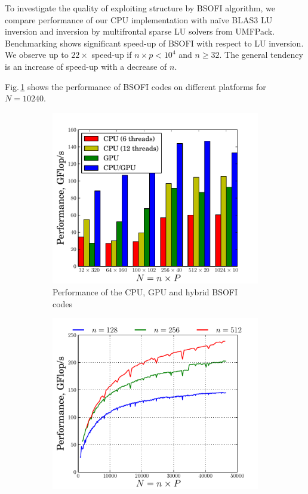 \documentclass{llncs}
\begin{document}
To investigate the quality of exploiting structure by BSOFI algorithm,
we compare performance of our 
CPU implementation with na\"ive BLAS3 LU inversion 
and inversion by multifrontal sparse LU solvers from {\sc UMFPack}. 
Benchmarking shows 
significant speed-up of BSOFI with respect to LU inversion.
We observe up to $22\times$ speed-up if $n\times p < 10^4$ and $n \ge 32$. 
The general tendency is an increase of speed-up with a decrease of $n$.

Fig.\,\ref{fig:compare_BSOFTRI+BSOI} shows the performance of 
BSOFI codes on different platforms for $N=10240$.
\begin{figure}[t]%
  \centering

  \begin{subfigure}[t]{0.49\linewidth}
    \includegraphics[width=\textwidth]{./figs/pdf/BSOFI_BSOI_12}
    \caption{Performance of the CPU, GPU and hybrid BSOFI codes\label{fig:compare_BSOFTRI+BSOI}}
  \end{subfigure}
  \begin{subfigure}[t]{0.49\linewidth}
    \includegraphics[width=\textwidth]{./figs/pdf/BSOFTRI_BSOI}

\end{subfigure}
\end{figure}
\end{document}
